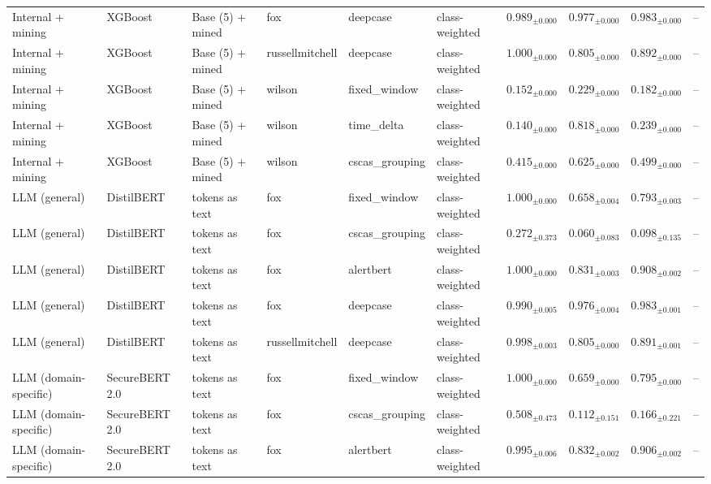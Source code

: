 \begin{longtable}{llllllcccc}
\addlinespace
Internal + mining & XGBoost & Base (5) + mined & fox & deepcase & class-weighted & $0.989_{\pm 0.000}$ & $0.977_{\pm 0.000}$ & $0.983_{\pm 0.000}$ & -- \\
\addlinespace
Internal + mining & XGBoost & Base (5) + mined & russellmitchell & deepcase & class-weighted & $1.000_{\pm 0.000}$ & $0.805_{\pm 0.000}$ & $0.892_{\pm 0.000}$ & -- \\
\addlinespace
Internal + mining & XGBoost & Base (5) + mined & wilson & fixed\_window & class-weighted & $0.152_{\pm 0.000}$ & $0.229_{\pm 0.000}$ & $0.182_{\pm 0.000}$ & -- \\
\addlinespace
Internal + mining & XGBoost & Base (5) + mined & wilson & time\_delta & class-weighted & $0.140_{\pm 0.000}$ & $0.818_{\pm 0.000}$ & $0.239_{\pm 0.000}$ & -- \\
\addlinespace
Internal + mining & XGBoost & Base (5) + mined & wilson & cscas\_grouping & class-weighted & $0.415_{\pm 0.000}$ & $0.625_{\pm 0.000}$ & $0.499_{\pm 0.000}$ & -- \\
\midrule
LLM (general) & DistilBERT & tokens as text & fox & fixed\_window & class-weighted & $1.000_{\pm 0.000}$ & $0.658_{\pm 0.004}$ & $0.793_{\pm 0.003}$ & -- \\
\addlinespace
LLM (general) & DistilBERT & tokens as text & fox & cscas\_grouping & class-weighted & $0.272_{\pm 0.373}$ & $0.060_{\pm 0.083}$ & $0.098_{\pm 0.135}$ & -- \\
\addlinespace
LLM (general) & DistilBERT & tokens as text & fox & alertbert & class-weighted & $1.000_{\pm 0.000}$ & $0.831_{\pm 0.003}$ & $0.908_{\pm 0.002}$ & -- \\
\addlinespace
LLM (general) & DistilBERT & tokens as text & fox & deepcase & class-weighted & $0.990_{\pm 0.005}$ & $0.976_{\pm 0.004}$ & $0.983_{\pm 0.001}$ & -- \\
\addlinespace
LLM (general) & DistilBERT & tokens as text & russellmitchell & deepcase & class-weighted & $0.998_{\pm 0.003}$ & $0.805_{\pm 0.000}$ & $0.891_{\pm 0.001}$ & -- \\
\addlinespace
LLM (domain-specific) & SecureBERT 2.0 & tokens as text & fox & fixed\_window & class-weighted & $1.000_{\pm 0.000}$ & $0.659_{\pm 0.000}$ & $0.795_{\pm 0.000}$ & -- \\
\addlinespace
LLM (domain-specific) & SecureBERT 2.0 & tokens as text & fox & cscas\_grouping & class-weighted & $0.508_{\pm 0.473}$ & $0.112_{\pm 0.151}$ & $0.166_{\pm 0.221}$ & -- \\
\addlinespace
LLM (domain-specific) & SecureBERT 2.0 & tokens as text & fox & alertbert & class-weighted & $0.995_{\pm 0.006}$ & $0.832_{\pm 0.002}$ & $0.906_{\pm 0.002}$ & -- \\

\end{longtable}

